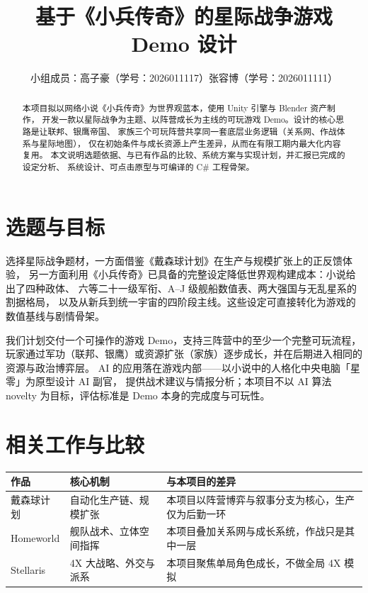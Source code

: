 \documentclass[UTF8,a4paper,11pt]{ctexart}
\title{基于《小兵传奇》的星际战争游戏 Demo 设计}
\author{小组成员：高子豪（学号：2026011117）\quad 张容博（学号：2026011111）}
\date{}
\begin{document}
\maketitle
\vspace*{-2ex}

\begin{abstract}
\noindent 本项目拟以网络小说《小兵传奇》为世界观蓝本，使用 Unity 引擎与 Blender 资产制作，
开发一款以星际战争为主题、以阵营成长为主线的可玩游戏 Demo。设计的核心思路是让联邦、银鹰帝国、
家族三个可玩阵营共享同一套底层业务逻辑（关系网、作战体系与星际地图），
仅在初始条件与成长资源上产生差异，从而在有限工期内最大化内容复用。
本文说明选题依据、与已有作品的比较、系统方案与实现计划，并汇报已完成的设定分析、
系统设计、可点击原型与可编译的 C\# 工程骨架。
\end{abstract}

\section{选题与目标}

选择星际战争题材，一方面借鉴《戴森球计划》在生产与规模扩张上的正反馈体验，
另一方面利用《小兵传奇》已具备的完整设定降低世界观构建成本：小说给出了四种政体、
六等二十一级军衔、A--J 级舰船数值表、两大强国与无乱星系的割据格局，
以及从新兵到统一宇宙的四阶段主线。这些设定可直接转化为游戏的数值基线与剧情骨架。

我们计划交付一个可操作的游戏 Demo，支持三阵营中的至少一个完整可玩流程，
玩家通过军功（联邦、银鹰）或资源扩张（家族）逐步成长，并在后期进入相同的资源与政治博弈层。
AI 的应用落在游戏内部——以小说中的人格化中央电脑「星零」为原型设计 AI 副官，
提供战术建议与情报分析；本项目不以 AI 算法 novelty 为目标，评估标准是 Demo 本身的完成度与可玩性。

\section{相关工作与比较}

\begin{table}[h]
\centering
\small
\begin{tabular}{l l l}
\toprule
作品 & 核心机制 & 与本项目的差异 \\
\midrule
戴森球计划 & 自动化生产链、规模扩张 & 本项目以阵营博弈与叙事分支为核心，生产仅为后勤一环 \\
Homeworld & 舰队战术、立体空间指挥 & 本项目叠加关系网与成长系统，作战只是其中一层 \\
Stellaris & 4X 大战略、外交与派系 & 本项目聚焦单局角色成长，不做全局 4X 模拟 \\
\bottomrule
\end{tabular}
\end{table}
\end{document}
